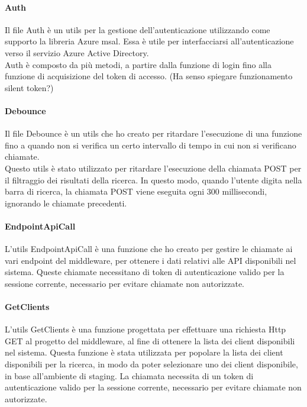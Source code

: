 \paragraph{Auth}\label{par:auth-utils}
Il file Auth è un utils per la gestione dell'autenticazione utilizzando come supporto la libreria Azure msal. Essa è utile
per interfacciarsi all'autenticazione verso il servizio Azure Active Directory.\\
Auth è composto da più metodi, a partire dalla funzione di login fino alla funzione di acquisizione del token di accesso.
(Ha senso spiegare funzionamento silent token?)

\paragraph{Debounce}\label{par:debounce}
Il file Debounce è un utils che ho creato per ritardare l'esecuzione di una funzione fino a quando non si verifica
un certo intervallo di tempo in cui non si verificano chiamate.\\
Questo utils è stato utilizzato per ritardare l'esecuzione della chiamata POST per il filtraggio dei risultati della ricerca. 
In questo modo, quando l'utente digita nella barra di ricerca, la chiamata POST viene eseguita ogni 300 millisecondi, ignorando le chiamate precedenti.

\paragraph{EndpointApiCall}\label{par:endpoint-api-call}
L'utils EndpointApiCall è una funzione che ho creato per gestire le chiamate ai vari endpoint del middleware, per ottenere
i dati relativi alle API disponibili nel sistema.
Queste chiamate necessitano di token di autenticazione valido per la sessione corrente, necessario per evitare chiamate non autorizzate.

\paragraph{GetClients}\label{par:get-clients}
L'utils GetClients è una funzione progettata per effettuare una richiesta Http GET al progetto del middleware, al fine di
ottenere la lista dei client disponibili nel sistema. Questa funzione è stata utilizzata per popolare la lista dei client disponibili
per la ricerca, in modo da poter selezionare uno dei client disponibile, in base all'ambiente di staging.
La chiamata necessita di un token di autenticazione valido per la sessione corrente, necessario per evitare chiamate non autorizzate.

